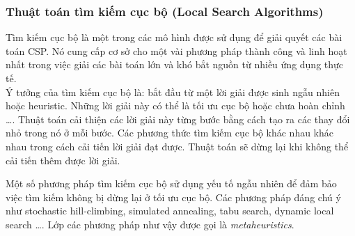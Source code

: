\documentclass[a4paper,12pt]{report}
\begin{document}
\subsubsection{Thuật toán tìm kiếm cục bộ (Local Search Algorithms)}
Tìm kiếm cục bộ \cite{MTH} là một trong các mô hình được sử dụng để giải quyết các bài toán CSP. Nó cung cấp cơ sở cho một vài phương pháp thành công và linh hoạt nhất trong việc giải các bài toán lớn và khó bắt nguồn từ nhiều ứng dụng thực tế. \\

Ý tưởng của tìm kiếm cục bộ là: bắt đầu từ một lời giải được sinh ngẫu nhiên hoặc heuristic. Những lời giải này có thể là tối ưu cục bộ hoặc chưa hoàn chỉnh \dots. Thuật toán cải thiện các lời giải này từng bước bằng cách tạo ra các thay đổi nhỏ trong nó ở mỗi bước. Các phương thức tìm kiếm cục bộ khác nhau khác nhau trong cách cải tiến lời giải đạt được. Thuật toán sẽ dừng lại khi không thể cải tiến thêm được lời giải.

Một số phương pháp tìm kiếm cục bộ sử dụng yếu tố ngẫu nhiên để đảm bảo việc tìm kiếm không bị dừng lại ở tối ưu cục bộ. Các phương pháp đáng chú ý như stochastic hill-climbing, simulated annealing, tabu search, dynamic local search \dots. Lớp các phương pháp như vậy được gọi là \textit{metaheuristics}.


\end{document}
